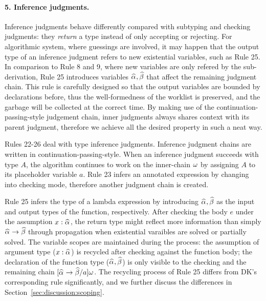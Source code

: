 \paragraph{\bf 5. Inference judgments.}
Inference judgments behave differently compared with subtyping and checking judgments:
they \emph{return} a type instead of only accepting or rejecting.
For algorithmic system, where guessings are involved,
it may happen that the output type of an inference judgment refers to new existential variables,
such as Rule 25.
In comparison to Rule 8 and 9, where new variables are only refered by the sub-derivation,
Rule 25 introduces variables $\al, \bt$ that affect the remaining judgment chain.
This rule is carefully designed so that the output variables are bounded by declarations before,
thus the well-formedness of the worklist is preserved,
and the garbage will be collected at the correct time.
By making use of the continuation-passing-style judgement chain,
inner judgments always shares context with its parent judgment,
therefore we achieve all the desired property in such a neat way.

\begin{comment}
Old text:
The design of our judgment chain is closely related to the shape of
the judgments
\jimmy{requires further clarification}
\bruno{What property? Not very clear}.
Subtyping and checking do not return anything, so variables cannot
leak anyway, as applied to Rules 8 and 9.
\bruno{Is the discussion that follows in the right place? We just jump
  to
  rule 26. Perhaps we can wait until we talk about inference to
  discuss those issues?}
However, inference and application inference may return a type that contains new variables.
Take Rule 26 as an example, if it simply returns $\al \to \bt$,
passes that to the next judgment and continues the type-checking process,
variables $\al$ and $\bt$ in the next judgment are out of scope
and will break the well-formedness of the worklist.
\end{comment}

Rules 22-26 deal with type inference judgments.
Inference judgment chains are written in continuation-passing-style.
When an inference judgment succeeds with type $A$,
the algorithm continues to work on the inner-chain $\omega$ by assigning $A$ to its placeholder variable $a$.
Rule 23 infers an annotated expression by changing into checking mode,
therefore another judgment chain is created.

Rule 25 infers the type of a lambda expression by introducing $\al, \bt$
as the input and output types of the function, respectively.
After checking the body $e$ under the assumption $x:\al$,
the return type might reflect more information than simply $\al \to \bt$
through propagation when existential varaibles are solved or partially solved.
The variable scopes are maintained during the process:
the assumption of argument type ($x:\al$) is recycled after checking against the function body;
the declaration of the function type ($\al,\bt$) is only visible to
the checking and the remaining chain $[\al\to\bt/a]\jg$.
The recycling process of Rule 25 differs from DK's corresponding rule significantly,
and we further discuss the differences in Section~\ref{sec:discussion:scoping}.

